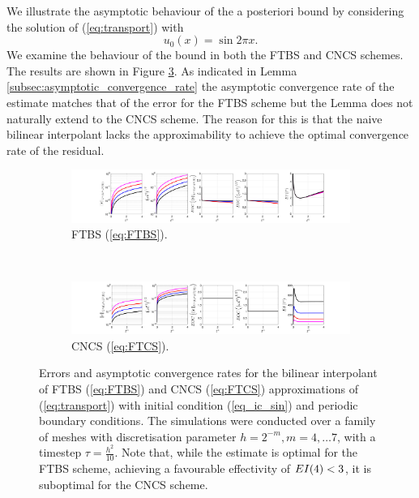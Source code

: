 \documentclass[final]{amsart}
\numberwithin{equation}{section}
\begin{document}
We illustrate the asymptotic behaviour of the a posteriori bound by
considering the solution of (\ref{eq:transport}) with
\begin{equation}
  \label{eq_ic_sin}
  u_0(x) = \sin{2\pi x}.
\end{equation}
We examine the behaviour of the bound in both the FTBS and CNCS
schemes. The results are shown in Figure
\ref{fig:bilinearLagrange}. As indicated in Lemma
\ref{subsec:asymptotic_convergence_rate} the asymptotic convergence
rate of the estimate matches that of the error for the FTBS scheme but
the Lemma does not naturally extend to the CNCS scheme. The reason for
this is that the naive bilinear interpolant lacks the approximability
to achieve the optimal convergence rate of the residual.
\begin{figure}[H]
	\begin{subfigure}[b]{\textwidth}
		\includegraphics[width=\textwidth]{../figures/fig_FTBSplots_1x5_sin_IC_ind_uniform_P1}	
		\caption{
			\label{sfig:FTBS_prelim}
			FTBS (\ref{eq:FTBS}).
		}
	\end{subfigure}
	\\
	\begin{subfigure}[b]{\textwidth}

		\includegraphics[width=\textwidth]{../figures/fig_CNCS_plots_1x5_sin_IC_ind_uniform_P1}	

		\caption{\label{sfig:FTCS_prelim_P1}
		  CNCS (\ref{eq:FTCS}).
               }
	\end{subfigure}
	\caption{\label{fig:bilinearLagrange}
          Errors and asymptotic
          convergence rates for the bilinear interpolant of FTBS
          (\ref{eq:FTBS}) and CNCS (\ref{eq:FTCS}) approximations of
          (\ref{eq:transport}) with initial condition
          (\ref{eq_ic_sin}) and periodic boundary conditions. The
          simulations were conducted over a family of meshes with
          discretisation parameter $h = 2^{-m}, m = 4,\dots 7$, with a
          timestep $\tau = \tfrac{h^2}{10}$. Note that, while the estimate is
          optimal for the FTBS scheme, achieving a  favourable
          effectivity of $EI \!\left({4}\right) < 3$, it is suboptimal for
          the CNCS scheme.  }
\end{figure}
\end{document}

